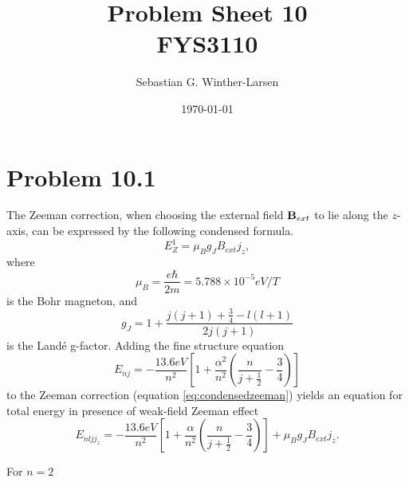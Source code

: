 \documentclass[11pt]{amsart}
\title[Problem Sheet 10]{Problem Sheet 10\\
		\large{FYS3110}}
\author[Winther-Larsen]{Sebastian G. Winther-Larsen}
\date{\today}
\begin{document}
\maketitle

\section*{Problem 10.1}
The Zeeman correction, when choosing the external field $\vb{B}_{ext}$ to lie along the $z$-axis, can be expressed by the following condensed formula.
\begin{equation}
\label{eq:condensedzeeman}
E_Z^1 = \mu_B g_J B_{ext} j_z,
\end{equation}
where
\begin{equation}
\label{eq:bohrmagneton}
\mu_B = \frac{e\hbar}{2m} = 5.788\times10^{-5}eV/T
\end{equation}
is the Bohr magneton, and
\begin{equation}
\label{eq:langeg}
g_J=1 + \frac{j(j+1) + \frac{3}{4} - l(l+1)}{2j(j+1)}
\end{equation}
is the Landé g-factor. Adding the fine structure equation
\begin{equation}
\label{eq:finestructure}
E_{nj} = -\frac{13.6eV}{n^2}\left[1 + \frac{\alpha^2}{n^2} \left(\frac{n}{j + \frac{1}{2}} -\frac{3}{4} \right) \right]
\end{equation}
to the Zeeman correction (equation \ref{eq:condensedzeeman}) yields an equation for total energy in presence of weak-field Zeeman effect
\begin{equation}
\label{eq:totalweakzeeman}
E_{nljj_z} = -\frac{13.6eV}{n^2} \left[1 + \frac{\alpha}{n^2}\left(\frac{n}{j + \frac{1}{2}} -\frac{3}{4} \right) \right] + \mu_B g_J B_{ext} j_z.
\end{equation}

For $n=2$
\end{document}
